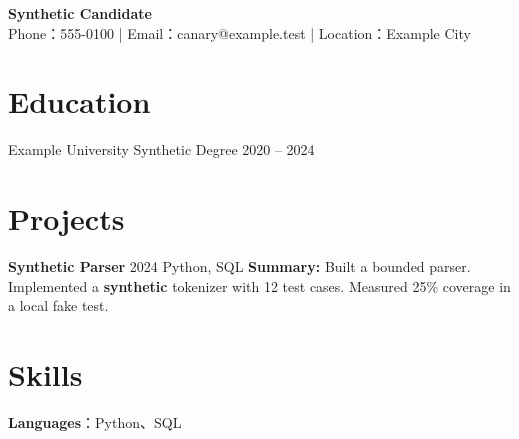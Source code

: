\documentclass{article}
\newcommand{\resumeEducationHeading}[3]{#1 #2 #3}
\newcommand{\resumeProjectHeading}[4]{#1 #2 #3 #4}
\newcommand{\resumeItem}[1]{#1}
\newcommand{\skilltag}[1]{#1}
\newcommand{\skillgap}{, }
\begin{document}
\begin{center}
{\LARGE\bfseries\color{resumeBlue} Synthetic Candidate} \\ \vspace{2pt}
\large Phone：555-0100 | Email：{canary@example.test} | Location：Example City
\end{center}
\section{Education}
\resumeEducationListStart
\resumeEducationHeading
{Example University}{Synthetic Degree}{2020 -- 2024}
\resumeEducationListEnd
\section{Projects}
\resumeProjectListStart
\resumeProjectHeading
{\textbf{Synthetic Parser}}{2024}
{\skilltag{Python}\skillgap\skilltag{SQL}}
{\textbf{Summary: }Built a bounded parser.}
\resumeItemListStart
\resumeItem{Implemented a \textbf{synthetic} tokenizer with 12 test cases.}
\resumeItem{Measured 25\% coverage in a local fake test.}
\resumeItemListEnd
\resumeProjectListEnd
\section{Skills}
\begin{itemize}
\normalsize{\item{
\textbf{Languages}{：Python、SQL} \\
}}
\end{itemize}
\end{document}
